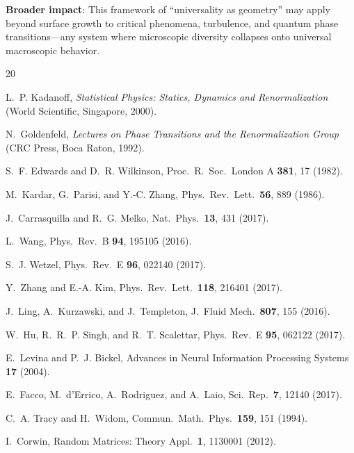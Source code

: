 \documentclass[aps,pre,twocolumn,superscriptaddress,showpacs]{revtex4-2}
\begin{document}
\textbf{Broader impact}: This framework of ``universality as geometry'' may apply beyond surface growth to critical phenomena, turbulence, and quantum phase transitions---any system where microscopic diversity collapses onto universal macroscopic behavior.

\begin{acknowledgments}
[To be added]
\end{acknowledgments}

\begin{thebibliography}{20}

L.~P. Kadanoff, \emph{Statistical Physics: Statics, Dynamics and Renormalization} (World Scientific, Singapore, 2000).

N.~Goldenfeld, \emph{Lectures on Phase Transitions and the Renormalization Group} (CRC Press, Boca Raton, 1992).

S.~F. Edwards and D.~R. Wilkinson, Proc.\ R.\ Soc.\ London A \textbf{381}, 17 (1982).

M.~Kardar, G.~Parisi, and Y.-C. Zhang, Phys.\ Rev.\ Lett.\ \textbf{56}, 889 (1986).

J.~Carrasquilla and R.~G. Melko, Nat.\ Phys.\ \textbf{13}, 431 (2017).

L.~Wang, Phys.\ Rev.\ B \textbf{94}, 195105 (2016).

S.~J. Wetzel, Phys.\ Rev.\ E \textbf{96}, 022140 (2017).

Y.~Zhang and E.-A. Kim, Phys.\ Rev.\ Lett.\ \textbf{118}, 216401 (2017).

J.~Ling, A.~Kurzawski, and J.~Templeton, J.\ Fluid Mech.\ \textbf{807}, 155 (2016).

W.~Hu, R.~R.~P. Singh, and R.~T. Scalettar, Phys.\ Rev.\ E \textbf{95}, 062122 (2017).

E.~Levina and P.~J. Bickel, Advances in Neural Information Processing Systems \textbf{17} (2004).

E.~Facco, M.~d'Errico, A.~Rodriguez, and A.~Laio, Sci.\ Rep.\ \textbf{7}, 12140 (2017).

C.~A. Tracy and H.~Widom, Commun.\ Math.\ Phys.\ \textbf{159}, 151 (1994).

I.~Corwin, Random Matrices: Theory Appl.\ \textbf{1}, 1130001 (2012).


\end{thebibliography}
\end{document}
